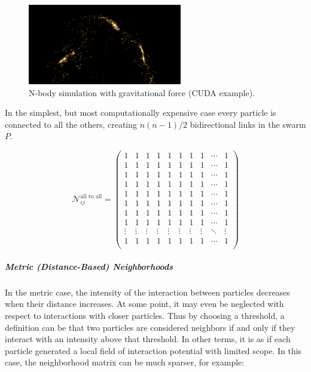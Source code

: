 \begin{figure}
\begin{center}
\includegraphics[width=0.6\textwidth]{../../images/nbody/nbody2.png}
\end{center}
\caption{N-body simulation with gravitational force (CUDA example).}
\label{nbody_nbody2}
\end{figure}

In the simplest, but most computationally expensive case every particle is connected to all the others, creating $n(n-1)/2$ bidirectional links in the swarm $P$.

  $$\mathcal{N}^{\text{all to all}}_{ij} =  \begin{pmatrix}  1 & 1 & 1 & 1 & 1 & 1 & 1 & 1 & \cdots & 1 \\  1 & 1 & 1 & 1 & 1 & 1 & 1 & 1 & \cdots & 1 \\  1 & 1 & 1 & 1 & 1 & 1 & 1 & 1 & \cdots & 1 \\  1 & 1 & 1 & 1 & 1 & 1 & 1 & 1 & \cdots & 1 \\  1 & 1 & 1 & 1 & 1 & 1 & 1 & 1 & \cdots & 1 \\  1 & 1 & 1 & 1 & 1 & 1 & 1 & 1 & \cdots & 1 \\  1 & 1 & 1 & 1 & 1 & 1 & 1 & 1 & \cdots & 1 \\  1 & 1 & 1 & 1 & 1 & 1 & 1 & 1 & \cdots & 1 \\  \vdots  & \vdots  & \vdots  & \vdots  & \vdots  & \vdots  & \vdots  & \vdots  & \ddots & \vdots  \\  1 & 1 & 1 & 1 & 1 & 1 & 1 & 1 & \cdots & 1 \\  \end{pmatrix}$$ 

\subparagraph{Metric (Distance-Based) Neighborhoods}


In the metric case, the intensity of the interaction between particles decreases when their distance increases. At some point, it may even be neglected with respect to interactions with closer particles. Thus by choosing a threshold, a definition can be that two particles are considered neighbors if and only if they interact with an intensity above that threshold. In other terms, it is as if each particle generated a local field of interaction potential with limited scope. In this case, the neighborhood matrix can be much sparser, for example:

